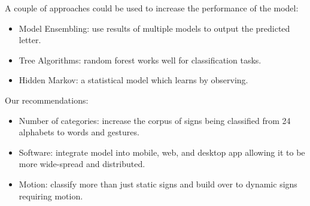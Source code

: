 \documentclass[twocolumn]{article}
\begin{document}
A couple of approaches could be used to increase the performance of the model:

\begin{itemize}
	\item Model Ensembling: use results of multiple models to output the 
	predicted letter.
	\item Tree Algorithms: random forest works well for classification tasks.
	\item Hidden Markov: a statistical model which learns by observing.
\end{itemize}

Our recommendations:

\begin{itemize}
	\item Number of categories: increase the corpus of signs being classified 
	from 24 alphabets to words and gestures.
	\item Software: integrate model into mobile, web, and desktop app allowing 
	it to be more wide-spread and distributed.
	\item Motion: classify more than just static signs and build over to dynamic 
	signs requiring motion.
\end{itemize}





\listoffigures
\listoftables

\glsaddall
\setlength{\glsdescwidth}{0.8\textwidth}
\printglossary[type=\acronymtype,title=List Of Abbreviations]
\end{document}
